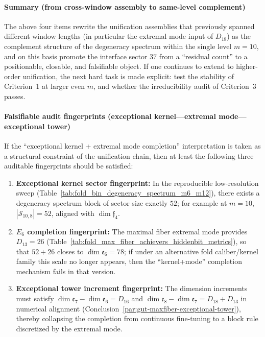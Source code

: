 \paragraph{Summary (from cross-window assembly to same-level complement)}
The above four items rewrite the unification assemblies that previously spanned different window lengths (in particular the extremal mode input of \(D_{18}\)) as the complement structure of the degeneracy spectrum within the single level \(m=10\),
and on this basis promote the interface sector \(37\) from a ``residual count'' to a positionable, closable, and falsifiable object.
If one continues to extend to higher-order unification, the next hard task is made explicit:
test the stability of Criterion~1 at larger even \(m\), and whether the irreducibility audit of Criterion~3 passes.

\paragraph{Falsifiable audit fingerprints (exceptional kernel---extremal mode---exceptional tower)}\label{par:gut-exceptional-fingerprint}
If the ``exceptional kernel + extremal mode completion'' interpretation is taken as a structural constraint of the unification chain, then at least the following three auditable fingerprints should be satisfied:
\begin{enumerate}
  \item \textbf{Exceptional kernel sector fingerprint:} In the reproducible low-resolution sweep (Table~\ref{tab:fold_bin_degeneracy_spectrum_m6_m12}), there exists a degeneracy spectrum block of sector size exactly \(52\); for example at \(m=10\), \(|\mathcal{S}_{10,8}|=52\), aligned with \(\dim\mathfrak{f}_4\).
  \item \textbf{\texorpdfstring{$E_6$}{E6} completion fingerprint:} The maximal fiber extremal mode provides \(D_{13}=26\) (Table~\ref{tab:fold_max_fiber_achievers_hiddenbit_metrics}), so that \(52+26\) closes to \(\dim\mathfrak{e}_6=78\); if under an alternative fold caliber/kernel family this scale no longer appears, then the ``kernel+mode'' completion mechanism fails in that version.
  \item \textbf{Exceptional tower increment fingerprint:} The dimension increments must satisfy
  \(\dim\mathfrak{e}_7-\dim\mathfrak{e}_6=D_{16}\) and \(\dim\mathfrak{e}_8-\dim\mathfrak{e}_7=D_{18}+D_{13}\) in numerical alignment (Conclusion~\ref{par:gut-maxfiber-exceptional-tower}), thereby collapsing the completion from continuous fine-tuning to a block rule discretized by the extremal mode.
\end{enumerate}

